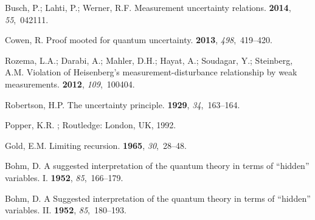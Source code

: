 \documentclass[information,article,accept,moreauthors,pdftex,12pt,a4paper]{mdpi}
\theoremstyle{mdpi}
\newcounter{re}
\theoremstyle{mdpidefinition}
\begin{document}
\begin{thebibliography}{----}
Busch, P.; Lahti, P.; Werner, R.F.
\newblock Measurement uncertainty relations.
 {\bf 2014}, {\em 55},~042111.

Cowen, R.
\newblock Proof mooted for quantum uncertainty.
 {\bf 2013}, {\em 498},~419--420.

Rozema, L.A.; Darabi, A.; Mahler, D.H.; Hayat, A.; Soudagar, Y.; Steinberg,
 A.M.
\newblock Violation of {H}eisenberg's measurement-disturbance relationship by
 weak measurements.
 {\bf 2012}, {\em 109},~100404.

Robertson, H.P.
\newblock The uncertainty principle.
 {\bf 1929}, {\em 34},~163--164.

Popper, K.R.
; Routledge: London, UK, 1992.


\newpage

Gold, E.M.
\newblock Limiting recursion.
 {\bf 1965}, {\em 30},~28--48.

Bohm, D.
\newblock A suggested interpretation of the quantum theory in terms of
 ``hidden'' variables. I.
 {\bf 1952}, {\em 85},~166--179.

Bohm, D.
\newblock A Suggested interpretation of the quantum theory in terms of
 ``hidden'' variables. II.
 {\bf 1952}, {\em 85},~180--193.

\end{thebibliography}
\end{document}
